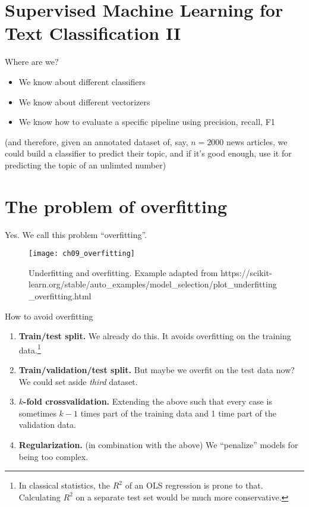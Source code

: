 \section[SML for text II]{Supervised Machine Learning for Text Classification II}

\begin{frame}{Where are we?}
  \begin{itemize}
  \item We know about different classifiers
  \item We know about different vectorizers
  \item We know how to evaluate a specific pipeline using precision, recall, F1
  \end{itemize}
(and therefore, given an annotated dataset of, say, $n=2000$ news articles, we could build a classifier to predict their topic, and if it's good enough, use it for predicting the topic of an unlimted number)
\end{frame}


\section[Overfitting]{The problem of overfitting}




\begin{frame}{Yes. We call this problem ``overfitting''.}

\begin{figure}
	\centering
	\texttt{[image: ch09\_overfitting]}
	\caption{Underfitting and overfitting. Example adapted from https://scikit-learn.org/stable/auto\_examples/model\_selection/plot\_underfitting\_overfitting.html}
	\label{fig:overfit}
\end{figure}
\end{frame}


\begin{frame}{How to avoid overfitting}
\begin{enumerate}[<+->]
	\item \textbf{Train/test split. } We already do this. It avoids overfitting on the training data.\footnote{In classical statistics, the $R^2$ of an OLS regression is prone to that. Calculating $R^2$ on a separate test set would be much more conservative.}
	\item \textbf{Train/validation/test split.} But maybe we overfit on the test data now? We could set aside \textit{third} dataset.
	\item \textbf{$k$-fold crossvalidation.} Extending the above such that every case is sometimes $k-1$ times part of the training data and 1 time part of the validation data.
	\item \textbf{Regularization.} (in combination with the above) We ``penalize'' models for being too complex.
\end{enumerate}

\end{frame}



